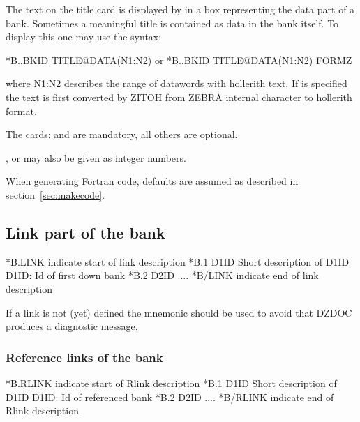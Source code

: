 \begin{Notes}
\item The text on the title card  is displayed by 
      in a box representing the data part of a bank. Sometimes  a
      meaningful title is contained as data in the bank itself.
      To display this one may use the syntax:
\begin{XMP}
*B..BKID  TITLE@DATA(N1:N2)
  or
*B..BKID  TITLE@DATA(N1:N2) FORMZ
\end{XMP}
      where N1:N2 describes the range of datawords with hollerith text.
      If  is specified the text is first converted by ZITOH
      from ZEBRA internal character to hollerith format. 
 
\item The cards:  and  are mandatory, all others are optional. 
\item {},  or  may also be given as integer numbers. 
\item When generating Fortran code,
      defaults are assumed as described in section~\ref{sec:makecode}.
\end{Notes}
 
\subsection{Link part of the bank}
 
\begin{XMP}
*B.LINK            \lcb indicate start of link description\rcb 
*B.1      D1ID     Short description of D1ID  \lcb D1ID: Id of first down bank\rcb 
*B.2      D2ID     ....
*B/LINK            \lcb indicate end of link description\rcb 
\end{XMP}
 
If a link is not (yet) defined  the mnemonic  should be used
to avoid that DZDOC produces a diagnostic message.
 
\subsubsection*{Reference links of the bank}
 
\begin{XMP}
*B.RLINK            \lcb indicate start of Rlink description\rcb 
*B.1      D1ID     Short description of D1ID  \lcb D1ID: Id of referenced bank\rcb 
*B.2      D2ID     ....
*B/RLINK            \lcb indicate end of Rlink description\rcb 
\end{XMP}
 
